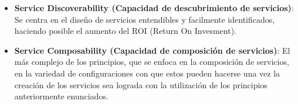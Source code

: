 \begin{itemize}
 \item \textbf{Service Discoverability (Capacidad de descubrimiento de servicios)}: Se centra en el diseño de servicios entendibles y facilmente identificados, haciendo posible el aumento del ROI (Return On Invesment). 

 \item \textbf{Service Composability (Capacidad de composición de servicios)}: El más complejo de los principios, que se enfoca en la composición de servicios, en la variedad de configuraciones con que estos pueden hacerse una vez la creación de los servicios sea lograda con la utilización de los principios anteriormente enunciados.
\end{itemize}